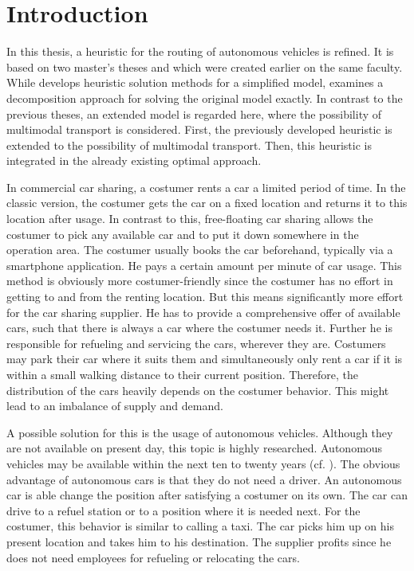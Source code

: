 \chapter{Introduction}

In this thesis, a heuristic for the routing of autonomous vehicles is refined. It is based on two master's theses \cite{Kaiser} and \cite{Knoll} which were created earlier on the same faculty. While \cite{Knoll} develops heuristic solution methods for a simplified model, \cite{Kaiser} examines a decomposition approach for solving the original model exactly. In contrast to the previous theses, an extended model is regarded here, where the possibility of multimodal transport is considered. First, the previously developed heuristic is extended to the possibility of multimodal transport. Then, this heuristic is integrated in the already existing optimal approach.

In commercial car sharing, a costumer rents a car a limited period of time. In the classic version, the costumer gets the car on a fixed location and returns it to this location after usage. In contrast to this, free-floating car sharing allows the costumer to pick any available car and to put it down somewhere in the operation area. The costumer usually books the car beforehand, typically via a smartphone application. He pays a certain amount per minute of car usage. This method is obviously more costumer-friendly since the costumer has no effort in getting to and from the renting location. But this means significantly more effort for the car sharing supplier. He has to provide a comprehensive offer of available cars, such that there is always a car where the costumer needs it. Further he is responsible for refueling and servicing the cars, wherever they are. Costumers may park their car where it suits them and simultaneously only rent a car if it is within a small walking distance to their current position. Therefore, the distribution of the cars heavily depends on the costumer behavior. This might lead to an imbalance of supply and demand.

A possible solution for this is the usage of autonomous vehicles. Although they are not available on present day, this topic is highly researched. Autonomous vehicles may be available within the next ten to twenty years (cf. \cite{Hauser}). The obvious advantage of autonomous cars is that they do not need a driver. An autonomous car is able change the position after satisfying a costumer on its own. The car can drive to a refuel station or to a position where it is needed next. For the costumer, this behavior is similar to calling a taxi. The car picks him up on his present location and takes him to his destination. The supplier profits since he does not need employees for refueling or relocating the cars.

